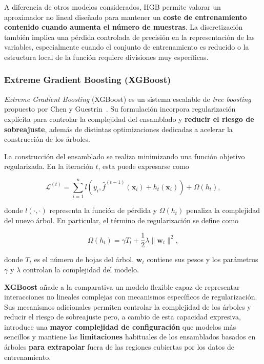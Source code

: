 A diferencia de otros modelos considerados, HGB permite valorar un aproximador no lineal diseñado para mantener un \textbf{coste de entrenamiento contenido cuando aumenta el número de muestras}. La discretización también implica una pérdida controlada de precisión en la representación de las variables, especialmente cuando el conjunto de entrenamiento es reducido o la estructura local de la función requiere divisiones muy específicas.

\subsubsection{Extreme Gradient Boosting (XGBoost)}

\textit{Extreme Gradient Boosting} (XGBoost) es un sistema escalable de \textit{tree boosting} propuesto por Chen y Guestrin~\cite{chen2016xgboost}. Su formulación incorpora regularización explícita para controlar la complejidad del ensamblado y \textbf{reducir el riesgo de sobreajuste}, además de distintas optimizaciones dedicadas a acelerar la construcción de los árboles.

La construcción del ensamblado se realiza minimizando una función objetivo regularizada. En la iteración \(t\), esta puede expresarse como

\begin{equation}
    \mathcal{L}^{(t)}
    =
    \sum_{i=1}^{n}
    l
    \left(
    y_i,
    \hat{f}^{(t-1)}(\mathbf{x}_i)
    +
    h_t(\mathbf{x}_i)
    \right)
    +
    \Omega(h_t),
\end{equation}

donde \(l(\cdot,\cdot)\) representa la función de pérdida y \(\Omega(h_t)\) penaliza la complejidad del nuevo árbol. En particular, el término de regularización se define como

\begin{equation}
    \Omega(h_t)
    =
    \gamma T_t
    +
    \frac{1}{2}
    \lambda
    \lVert
    \mathbf{w}_t
    \rVert^2,
\end{equation}

donde \(T_t\) es el número de hojas del árbol, \(\mathbf{w}_t\) contiene sus pesos y los parámetros \(\gamma\) y \(\lambda\) controlan la complejidad del modelo.

\textbf{XGBoost} añade a la comparativa un modelo flexible capaz de representar interacciones no lineales complejas con mecanismos específicos de regularización. Sus mecanismos adicionales permiten controlar la complejidad de los árboles y reducir el riesgo de sobreajuste pero, a cambio de esta capacidad expresiva, introduce una \textbf{mayor complejidad de configuración} que modelos más sencillos y mantiene las \textbf{limitaciones} habituales de los ensamblados basados en árboles \textbf{para extrapolar} fuera de las regiones cubiertas por los datos de entrenamiento.


